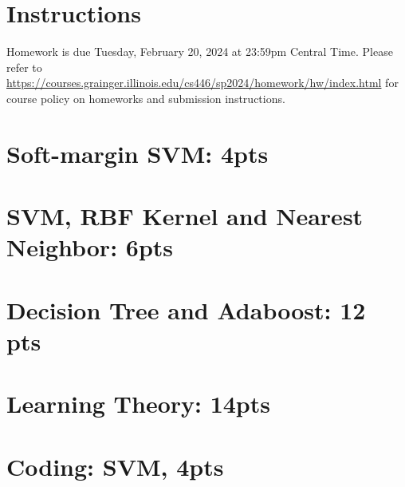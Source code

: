 \documentclass[12pt]{article}
\begin{document}
\singlespacing

\renewcommand{\familydefault}{\rmdefault}


\section{Instructions}

Homework is due Tuesday, February 20, 2024 at 23:59pm Central Time.
Please refer to \url{https://courses.grainger.illinois.edu/cs446/sp2024/homework/hw/index.html} for course policy on homeworks and submission instructions.

\section{Soft-margin SVM: 4pts}

\newpage

\section{SVM, RBF Kernel and Nearest Neighbor: 6pts}

\newpage

\section{Decision Tree and Adaboost: 12 pts}

\newpage

\section{Learning Theory: 14pts}

\newpage

\section{Coding: SVM, 4pts}
\end{document}
